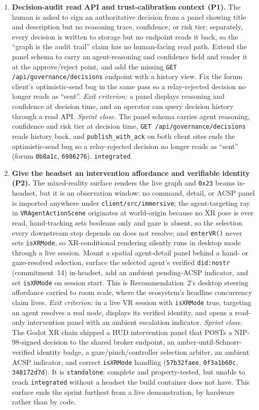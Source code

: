 \begin{enumerate}[start=13]
  \item \textbf{Decision-audit read API and trust-calibration context (P1).} The human is asked to sign an authoritative decision from a panel showing title and description but no reasoning trace, confidence, or risk tier; separately, every decision is written to storage but no endpoint reads it back, so the ``graph is the audit trail'' claim has no human-facing read path. Extend the panel schema to carry an agent-reasoning and confidence field and render it at the approve/reject point, and add the missing \texttt{GET /api/governance/decisions} endpoint with a history view. Fix the forum client's optimistic-send bug in the same pass so a relay-rejected decision no longer reads as ``sent''. \emph{Exit criterion:} a panel displays reasoning and confidence at decision time, and an operator can query decision history through a read API. \emph{Sprint close.} The panel schema carries agent reasoning, confidence and risk tier at decision time, \texttt{GET /api/governance/decisions} reads history back, and \texttt{publish\_with\_ack} on both client sites ends the optimistic-send bug so a relay-rejected decision no longer reads as ``sent'' (forum \texttt{0b8a1c}, \texttt{6986276}). \texttt{integrated}.

  \item \textbf{Give the headset an intervention affordance and verifiable identity (P2).} The mixed-reality surface renders the live graph and \texttt{0x23} beams in-headset, but it is an observation window: no command, detail, or ACSP panel is imported anywhere under \texttt{client/src/immersive}; the agent-targeting ray in \texttt{VRAgentActionScene} originates at world-origin because no XR pose is ever read, hand-tracking sets booleans only and gaze is absent, so the selection every downstream step depends on does not resolve; and \texttt{enterVR()} never sets \texttt{isXRMode}, so XR-conditional rendering silently runs in desktop mode through a live session. Mount a spatial agent-detail panel behind a hand- or gaze-resolved selection, surface the selected agent's verified \texttt{did:nostr} (commitment~14) in-headset, add an ambient pending-ACSP indicator, and set \texttt{isXRMode} on session start. This is Recommendation~2's desktop steering affordance carried to room scale, where the ecosystem's headline concurrency claim lives. \emph{Exit criterion:} in a live VR session with \texttt{isXRMode} true, targeting an agent resolves a real node, displays its verified identity, and opens a read-only intervention panel with an ambient escalation indicator. \emph{Sprint close.} The Godot XR chain shipped a HUD intervention panel that POSTs a NIP-98-signed decision to the shared broker endpoint, an amber-until-Schnorr-verified identity badge, a gaze/pinch/controller selection arbiter, an ambient ACSP indicator, and correct \texttt{isXRMode} handling (\texttt{57b32faee}, \texttt{0f3a1b60c}, \texttt{348172d7d}). It is \texttt{standalone}: complete and property-tested, but unable to reach \texttt{integrated} without a headset the build container does not have. This surface ends the sprint furthest from a live demonstration, by hardware rather than by code.
\end{enumerate}

